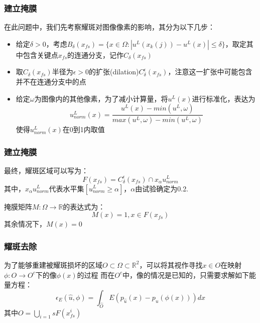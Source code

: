 \documentclass{beamer}
\begin{document}
\begin{frame}
\frametitle{建立掩膜}
在此问题中，我们先考察耀斑对图像像素的影响，其分为以下几步：\pause
\begin{itemize}
\item 给定$\delta>0$，考虑$B_{\delta}(x_
{fs})=\{x\in \Omega: |u^L(x_k(j))-u^L(x)|\leq \delta\}$，取定其中包含关键点$x_{fs}$的连通分支，记作$C_{\delta}(x_{fs})$\pause
\item 取$C_{\delta}(x_{fs})$半径为$\epsilon>0$的扩张(dilation)$C_{\delta}^{\epsilon}(x_{fs})$，注意这一扩张中可能包含并不在连通分支中的点\pause
\item 给定$\omega$为图像内的其他像素，为了减小计算量，将$u^L(x)$进行标准化，表达为
\begin{equation}
u^L_{norm}(x)=\frac{u^L(x)-min(u^L,\omega)}{max(u^L,\omega)-min(u^L,\omega)}
\end{equation}
使得$u^L_{norm}(x)$在0到1内取值
\end{itemize}
\end{frame}
\begin{frame}
\frametitle{建立掩膜}
最终，耀斑区域可以写为：
\begin{equation}
F(x_{fs})=C_{\delta}^{\epsilon}(x_{fs})\cap x_{\alpha}u^L_{norm}
\end{equation}\pause
其中，$x_{\alpha}u^L_{norm}$代表水平集$[u^L_{norm}\geq \alpha]$，$\alpha$由试验确定为0.2.\pause

掩膜矩阵$M:\Omega \rightarrow \mathbb{R}$的表达式为：
\begin{equation}
M(x)=1, x\in F(x_{fs})
\end{equation}
 其余情况下，$M(x)=0$
\end{frame}
\begin{frame}
\frametitle{耀斑去除}
为了能够重建被耀斑损坏的区域$O\subset \Omega\subset \mathbb{R}^2$，可以将其视作寻找$x\in O$在映射$\phi:O\rightarrow O^c$下的像$\phi(x)$的过程\pause
而在$O^c$中，像的情况是已知的，只需要求解如下能量方程：\pause
\begin{equation}
\epsilon_{E}(\hat{u},\phi)=\int_{\hat{O}}E(p_{\hat{u}}(x)-p_{u}(\phi(x)))dx
\end{equation}
其中$O=\bigcup_{i=1}{s}F(x_{fs}^{i})$

\end{frame}
\end{document}
